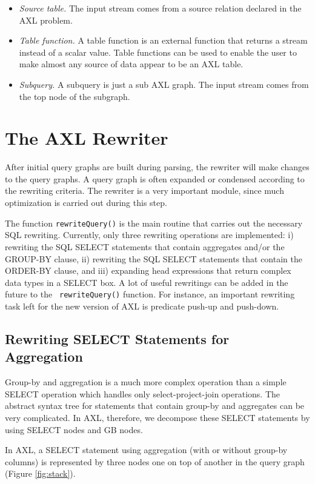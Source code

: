 \begin{itemize}
\item {\it Source table.} The input stream comes from a source
  relation declared in the AXL problem.
\item {\it Table function.} A table function is an external function
  that returns a stream instead of a scalar value. Table functions can
  be used to enable the user to make almost any source of data appear
  to be an AXL table.
\item {\it Subquery.} A subquery is just a sub AXL graph. The input
  stream comes from the top node of the subgraph.
\end{itemize}

\section{The AXL Rewriter}
After initial query graphs are built during parsing, the rewriter will
make changes to the query graphs. A query graph is often expanded or
condensed according to the rewriting criteria. The rewriter is a very
important module, since much optimization is carried out during this
step.

The function {\tt rewriteQuery()} is the main routine that carries out
the necessary SQL rewriting. Currently, only three rewriting
operations are implemented: i) rewriting the SQL SELECT statements
that contain aggregates and/or the GROUP-BY clause, ii) rewriting the
SQL SELECT statements that contain the ORDER-BY clause, and iii)
expanding head expressions that return complex data types in a SELECT
box. A lot of useful rewritings can be added in the future to the {\tt
  rewriteQuery()} function. For instance, an important rewriting task
left for the new version of AXL is predicate push-up and push-down.


\subsection{Rewriting SELECT Statements for Aggregation\label{sec:selstack}}

Group-by and aggregation is a much more complex operation than a
simple SELECT operation which handles only select-project-join
operations. The abstract syntax tree for statements that contain
group-by and aggregates can be very complicated.  In AXL, therefore,
we decompose these SELECT statements by using SELECT nodes and GB
nodes.

In AXL, a SELECT statement using aggregation (with or without group-by
columns) is represented by three nodes one on top of another in the
query graph (Figure \ref{fig:stack}).

